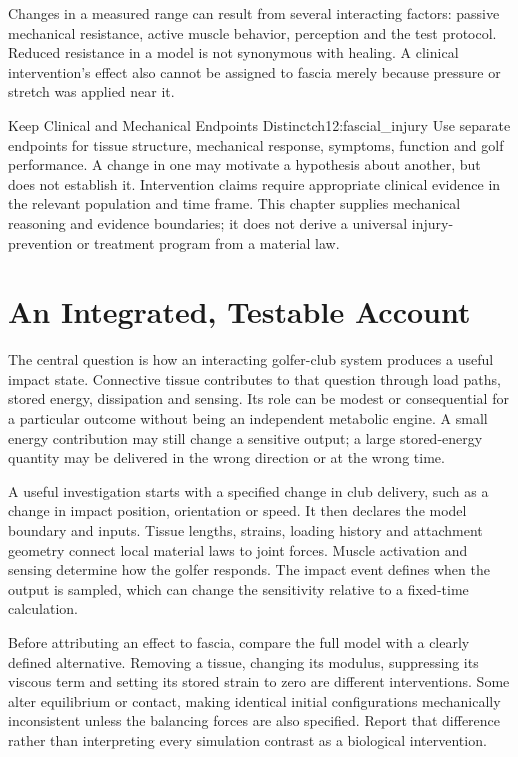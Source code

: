 Changes in a measured range can result from several interacting factors: passive mechanical resistance, active muscle behavior, perception and the test protocol. Reduced resistance in a model is not synonymous with healing. A clinical intervention's effect also cannot be assigned to fascia merely because pressure or stretch was applied near it.

\begin{principle}{Keep Clinical and Mechanical Endpoints Distinct}{ch12:fascial_injury}
Use separate endpoints for tissue structure, mechanical response, symptoms, function and golf performance. A change in one may motivate a hypothesis about another, but does not establish it. Intervention claims require appropriate clinical evidence in the relevant population and time frame. This chapter supplies mechanical reasoning and evidence boundaries; it does not derive a universal injury-prevention or treatment program from a material law.
\end{principle}

\section{An Integrated, Testable Account}

The central question is how an interacting golfer-club system produces a useful impact state. Connective tissue contributes to that question through load paths, stored energy, dissipation and sensing. Its role can be modest or consequential for a particular outcome without being an independent metabolic engine. A small energy contribution may still change a sensitive output; a large stored-energy quantity may be delivered in the wrong direction or at the wrong time.

A useful investigation starts with a specified change in club delivery, such as a change in impact position, orientation or speed. It then declares the model boundary and inputs. Tissue lengths, strains, loading history and attachment geometry connect local material laws to joint forces. Muscle activation and sensing determine how the golfer responds. The impact event defines when the output is sampled, which can change the sensitivity relative to a fixed-time calculation.

Before attributing an effect to fascia, compare the full model with a clearly defined alternative. Removing a tissue, changing its modulus, suppressing its viscous term and setting its stored strain to zero are different interventions. Some alter equilibrium or contact, making identical initial configurations mechanically inconsistent unless the balancing forces are also specified. Report that difference rather than interpreting every simulation contrast as a biological intervention.

